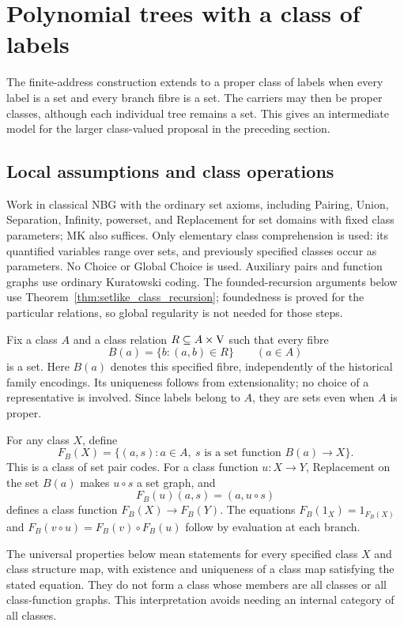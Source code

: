 \def\topic{Polynomial trees with a class of labels}

\section{Polynomial trees with a class of labels}
\label{sec:class_polynomial_trees}

The finite-address construction extends to a proper class of labels when
every label is a set and every branch fibre is a set. The carriers may
then be proper classes, although each individual tree remains a set.
This gives an intermediate model for the larger class-valued proposal
in the preceding section.

\subsection{Local assumptions and class operations}
Work in classical NBG with the ordinary set axioms, including Pairing,
Union, Separation, Infinity, powerset, and Replacement for set domains
with fixed class parameters; MK also suffices. Only elementary
class comprehension is used: its quantified variables range over sets,
and previously specified classes occur as parameters. No Choice or
Global Choice is used. Auxiliary pairs and function graphs use ordinary
Kuratowski coding. The founded-recursion arguments below use
Theorem~\ref{thm:setlike_class_recursion}; foundedness is proved for the
particular relations, so global regularity is not needed for those steps.

Fix a class $A$ and a class relation $R\subseteq A\times\mathrm{V}$ such that
every fibre
\[
B(a)=\{b:(a,b)\in R\}\qquad(a\in A)
\]
is a set. Here $B(a)$ denotes this specified fibre, independently of the
historical family encodings. Its uniqueness follows from extensionality;
no choice of a representative is involved. Since labels belong to $A$,
they are sets even when $A$ is proper.

For any class $X$, define
\[
F_B(X)=\{(a,s):a\in A,\ s\text{ is a set function }B(a)\to X\}.
\]
This is a class of set pair codes. For a class function $u:X\to Y$,
Replacement on the set $B(a)$ makes $u\circ s$ a set graph, and
\[
F_B(u)(a,s)=(a,u\circ s)
\]
defines a class function $F_B(X)\to F_B(Y)$. The equations
$F_B(1_X)=1_{F_B(X)}$ and
$F_B(v\circ u)=F_B(v)\circ F_B(u)$ follow by evaluation at each branch.

The universal properties below mean statements for every specified
class $X$ and class structure map, with existence and uniqueness of a
class map satisfying the stated equation. They do not form a class
whose members are all classes or all class-function graphs. This
interpretation avoids needing an internal category of all classes.

